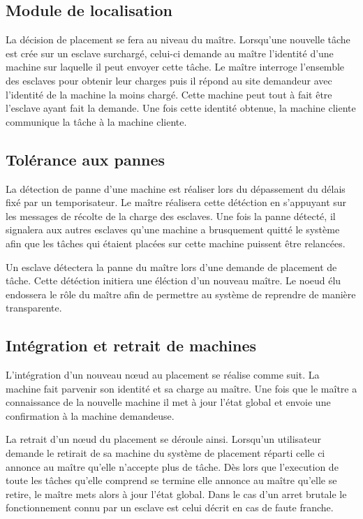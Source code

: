     \subsection{Module de localisation}

      La décision de placement se fera au niveau du maître.
      Lorsqu'une nouvelle tâche est crée sur un esclave surchargé,
      celui-ci demande au maître l'identité d'une machine sur laquelle
      il peut envoyer cette tâche. Le maître interroge l'ensemble des
      esclaves pour obtenir leur charges puis il répond au site
      demandeur avec l'identité de la machine la moins chargé. Cette
      machine peut tout à fait être l'esclave ayant fait la
      demande. Une fois cette identité obtenue, la machine cliente
      communique la tâche à la machine cliente.
      
    \subsection{Tolérance aux pannes}

      La détection de panne d'une machine est réaliser lors du
      dépassement du délais fixé par un temporisateur. Le maître
      réalisera cette détéction en s'appuyant sur les messages de
      récolte de la charge des esclaves. Une fois la panne détecté, il
      signalera aux autres esclaves qu'une machine a brusquement
      quitté le système afin que les tâches qui étaient placées sur
      cette machine puissent être relancées.
      
      Un esclave détectera la panne du maître lors d'une demande de
      placement de tâche. Cette détéction initiera une éléction d'un
      nouveau maître. Le noeud élu endossera le rôle du maître afin de
      permettre au système de reprendre de manière transparente.

    \subsection{Intégration et retrait de machines}

      L'intégration d'un nouveau n\oe{}ud au placement se réalise comme
      suit. La machine fait parvenir son identité et sa charge au
      maître. Une fois que le maître a connaissance de la nouvelle
      machine il met à jour l'état global et envoie une confirmation
      à la machine demandeuse.
      
      La retrait d'un n\oe{}ud du placement se déroule
      ainsi. Lorsqu'un utilisateur demande le retirait de sa machine
      du système de placement réparti celle ci annonce au maître
      qu'elle n'accepte plus de tâche. Dès lors que l'execution de
      toute les tâches qu'elle comprend se termine elle annonce au
      maître qu'elle se retire, le maître mets alors à jour l'état
      global. Dans le cas d'un arret brutale le fonctionnement connu
      par un esclave est celui décrit en cas de faute franche.
